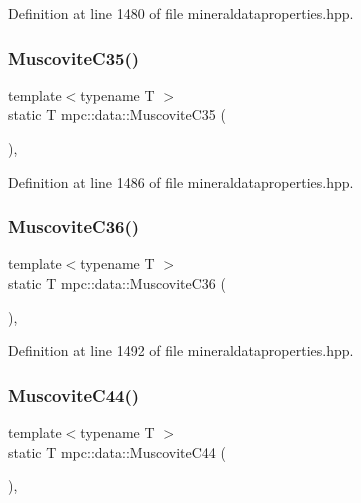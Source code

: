 Definition at line 1480 of file mineraldataproperties.\+hpp.

\mbox{\label{namespacempc_1_1data_a92878bf4f517d28f3edf25a44b16abd2}} 
\subsubsection{\texorpdfstring{Muscovite\+C35()}{MuscoviteC35()}}
{\footnotesize\ttfamily template$<$typename T $>$ \\
static T mpc\+::data\+::\+Muscovite\+C35 (\begin{DoxyParamCaption}{ }\end{DoxyParamCaption})\hspace{0.3cm}{\ttfamily [inline]}, {\ttfamily [static]}}



Definition at line 1486 of file mineraldataproperties.\+hpp.

\mbox{\label{namespacempc_1_1data_a551f2939c2653b76be2e1c26322307a3}} 
\subsubsection{\texorpdfstring{Muscovite\+C36()}{MuscoviteC36()}}
{\footnotesize\ttfamily template$<$typename T $>$ \\
static T mpc\+::data\+::\+Muscovite\+C36 (\begin{DoxyParamCaption}{ }\end{DoxyParamCaption})\hspace{0.3cm}{\ttfamily [inline]}, {\ttfamily [static]}}



Definition at line 1492 of file mineraldataproperties.\+hpp.

\mbox{\label{namespacempc_1_1data_a772833cee56d18ef7c90f5cf8084d22b}} 
\subsubsection{\texorpdfstring{Muscovite\+C44()}{MuscoviteC44()}}
{\footnotesize\ttfamily template$<$typename T $>$ \\
static T mpc\+::data\+::\+Muscovite\+C44 (\begin{DoxyParamCaption}{ }\end{DoxyParamCaption})\hspace{0.3cm}{\ttfamily [inline]}, {\ttfamily [static]}}



